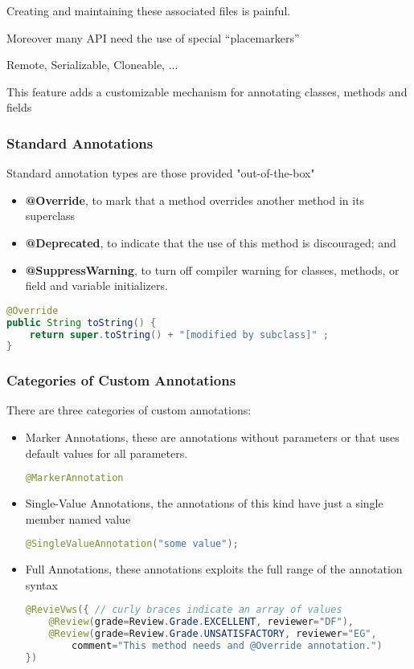 Creating and maintaining these associated files is painful.

Moreover many API need the use of special “placemarkers” 

Remote, Serializable, Cloneable, ... 

This feature adds a customizable mechanism for annotating classes, methods and fields

\subsubsection{Standard Annotations}

Standard annotation types are those provided "out-of-the-box"

\begin{itemize}
	\item \textbf{@Override}, to mark that a method overrides another method in its superclass
	\item \textbf{@Deprecated}, to indicate that the use of this method is discouraged; and
	\item \textbf{@SuppressWarning}, to turn off compiler warning for classes, methods, or field and variable initializers.
\end{itemize}

\begin{lstlisting}[language=Java]
@Override
public String toString() {
	return super.toString() + "[modified by subclass]" ;
}
\end{lstlisting}

\subsubsection{Categories of Custom Annotations}
There are three categories of custom annotations:
\begin{itemize}
	\item Marker Annotations, these are annotations without parameters or that uses default values for all parameters.
\begin{lstlisting}[language=Java]
@MarkerAnnotation
\end{lstlisting}	
	\item Single-Value Annotations, the annotations of this kind have just a single member named value
\begin{lstlisting}[language=Java]
@SingleValueAnnotation("some value");
\end{lstlisting}
	\item Full Annotations, these annotations exploits the full range of the annotation syntax
\begin{lstlisting}[language=Java]
@RevieVws({ // curly braces indicate an array of values
	@Review(grade=Review.Grade.EXCELLENT, reviewer="DF"),
	@Review(grade=Review.Grade.UNSATISFACTORY, reviewer="EG",
		comment="This method needs and @Override annotation.")
})
\end{lstlisting}
\end{itemize}












